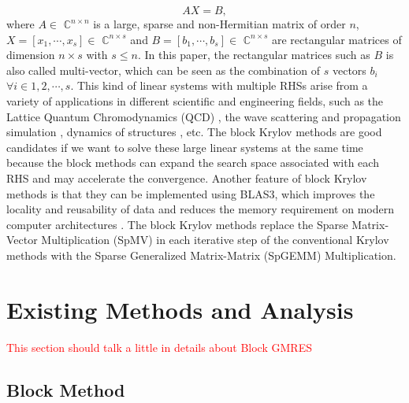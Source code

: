 \begin{equation}
\label{ax=b}
AX =  B,
\end{equation}
where $A \in$ $\mathbb{C}^{n \times n}$ is a large, sparse and non-Hermitian matrix of order $n$, $X=[x_1,\cdots,x_s] \in$  $\mathbb{C}^{n \times s}$ and $B=[b_1,\cdots,b_s] \in$  $\mathbb{C}^{n \times s}$ are rectangular matrices of dimension $n \times s$ with $s \leq n$. In this paper, the rectangular matrices such as $B$ is also called multi-vector, which can be seen as the combination of $s$ vectors $b_i$ $\forall i \in 1, 2, \cdots, s$. This kind of linear systems with multiple RHSs arise from a variety of applications in different scientific and engineering fields, such as the Lattice Quantum Chromodynamics (QCD) \cite{sakurai2010application, nakamura2012modified, fiebach1997variants}, the wave scattering and propagation simulation \cite{malhotra1997iterative}, dynamics of structures \cite{barbella2011block, ferraz2001block, nour1985short}, etc. The block Krylov methods are good candidates if we want to solve these large linear systems at the same time because the block methods can expand the search space associated with each RHS and may accelerate the convergence. Another feature of block Krylov methods is that they can be implemented using BLAS3, which improves the locality and reusability of data and reduces the memory requirement on modern computer architectures \cite{agullo2014block}. The block Krylov methods replace the Sparse Matrix-Vector Multiplication (SpMV) in each iterative step of the conventional Krylov methods with the Sparse Generalized Matrix-Matrix (SpGEMM) Multiplication.


\section{Existing Methods and Analysis}

\textcolor{red}{This section should talk a little in details about Block GMRES}

\subsection{Block Method}

